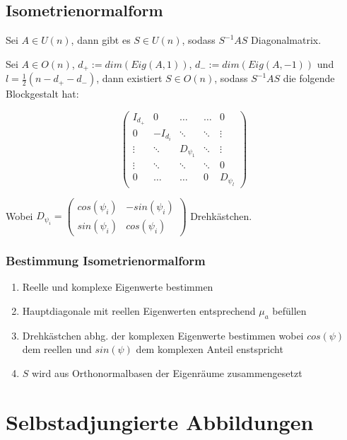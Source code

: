 \subsection*{Isometrienormalform}

Sei $A \in U(n)$, dann gibt es $S \in U(n)$, sodass $S^{-1} A S$ Diagonalmatrix.

Sei $A \in O(n)$, $d_+ := dim(Eig(A,1))$, $d_- := dim(Eig(A, -1))$ und $l = \frac{1}{2}(n - d_+ - d_-)$, dann existiert $S \in O(n)$, sodass $S^{-1} A S$ die folgende Blockgestalt hat:

$$\begin{pmatrix}
I_{d_+} & 0        & \hdots     & \hdots & 0      \\
0       & -I_{d_i} & \ddots     & \ddots & \vdots \\
\vdots  & \ddots   & D_{\psi_1} & \ddots & \vdots \\
\vdots  & \ddots   & \ddots     & \ddots & 0      \\
0       & \hdots   & \hdots     & 0      & D_{\psi_l}
\end{pmatrix}$$

Wobei $D_{\psi_i} = \begin{pmatrix} cos(\psi_i) & -sin(\psi_i) \\ sin(\psi_i) & cos(\psi_i) \end{pmatrix}$ Drehkästchen.

\subsubsection*{Bestimmung Isometrienormalform}

\begin{enumerate}[leftmargin=4mm]
	\item Reelle und komplexe Eigenwerte bestimmen
	\item Hauptdiagonale mit reellen Eigenwerten entsprechend $\mu_a$ befüllen
	\item Drehkästchen abhg. der komplexen Eigenwerte bestimmen wobei $cos(\psi)$ dem reellen und $sin(\psi)$ dem komplexen Anteil enstspricht
	\item $S$ wird aus Orthonormalbasen der Eigenräume zusammengesetzt
\end{enumerate}

\section*{Selbstadjungierte Abbildungen}

